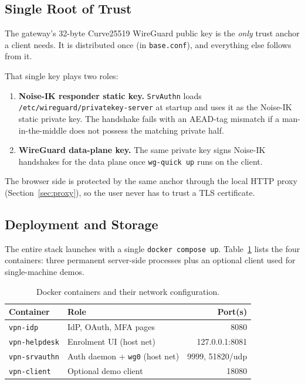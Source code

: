 \subsection{Single Root of Trust}
\label{sec:trust}
The gateway's 32-byte Curve25519 WireGuard public key is the \emph{only}
trust anchor a client needs.
It is distributed once (in \texttt{base.conf}), and everything else
follows from it.

That single key plays two roles:

\begin{enumerate}
  \item \textbf{Noise-IK responder static key.} \texttt{SrvAuthn} loads
    \texttt{/etc/wireguard/privatekey-server} at startup and uses it as
    the Noise-IK static private key. The handshake fails with an
    AEAD-tag mismatch if a man-in-the-middle does not possess the
    matching private half.
  \item \textbf{WireGuard data-plane key.} The same private key signs
    Noise-IK handshakes for the data plane once \texttt{wg-quick up}
    runs on the client.
\end{enumerate}

The browser side is protected by the same anchor through the local HTTP
proxy (Section~\ref{sec:proxy}), so the user never has to trust a TLS
certificate.

\subsection{Deployment and Storage}
The entire stack launches with a single \texttt{docker compose up}.
Table~\ref{tab:containers} lists the four containers: three permanent
server-side processes plus an optional client used for single-machine
demos.

\begin{table}[h]
\centering
\caption{Docker containers and their network configuration.}
\label{tab:containers}
\renewcommand{\arraystretch}{1.1}
\scriptsize
\begin{tabular}{llr}
\toprule
\textbf{Container} & \textbf{Role} & \textbf{Port(s)} \\
\midrule
\texttt{vpn-idp}       & IdP, OAuth, MFA pages    & 8080 \\
\texttt{vpn-helpdesk}  & Enrolment UI (host net)  & 127.0.0.1:8081 \\
\texttt{vpn-srvauthn}  & Auth daemon + \texttt{wg0} (host net) & 9999, 51820/udp \\
\texttt{vpn-client}    & Optional demo client     & 18080 \\
\bottomrule
\end{tabular}
\end{table}

